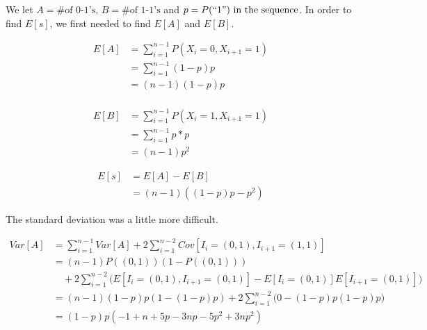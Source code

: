 \documentclass[12pt]{article}
\begin{document}
\appendix
	We let \(A = \text{\# of
    0-1's}\), \(B=\text{\# of 1-1's}\) and \(p=P(``1")\text{ in the sequence}\).
    In order to find \(E[s]\), we first needed to find \(E[A]\) and
    \(E[B]\).

    \begin{equation*}
        \begin{split}
        E[A]& =\sum_{i=1}^{n-1}P(X_i=0,X_{i+1}=1) \\
            & =\sum_{i=1}^{n-1}(1-p)p \\
            & =(n-1)(1-p)p \\
        \end{split}
    \end{equation*}

    \begin{equation*}
        \begin{split}
        E[B]& =\sum_{i=1}^{n-1}P(X_i=1,X_{i+1}=1) \\
            & =\sum_{i=1}^{n-1}p*p \\
            & =(n-1)p^2
        \end{split}
    \end{equation*}

    \begin{equation*}
        \begin{split}
        E[s]& =E[A]-E[B] \\
                  & =(n-1)\left((1-p)p-p^2\right)
        \end{split}
    \end{equation*}

    The standard deviation was a little more difficult.  

    \begin{equation*}
        \begin{split}
        Var[A]& =\sum_{i=1}^{n-1}Var[A]+2\sum_{i=1}^{n-2}Cov[I_i=(0,1),I_{i+1}=
                 (1,1)] \\
              & =(n-1)P((0,1))(1-P((0,1))) \\
              & \quad +2\sum_{i=1}^{n-2}\bigg(E[I_i=(0,1),I_{i+1}=(0,1)]-E[I_i=
                (0,1)]E[I_{i+1}=(0,1)]\bigg) \\
              & =(n-1)(1-p)p(1-(1-p)p)+2\sum_{i=1}^{n-2}\bigg(0-(1-p)p(1-p)p
                \bigg) \\
              & =(1-p)p(-1+n+5p-3np-5p^2+3np^2)
        \end{split}
    \end{equation*}
\end{document}
